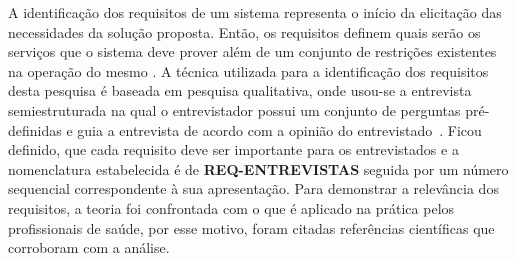 A identificação dos requisitos de um sistema representa o início da elicitação das necessidades da solução proposta. Então, os requisitos definem quais serão os serviços que o sistema deve prover além de um conjunto de restrições existentes na operação do mesmo \cite{sommerville2011}. A técnica utilizada para a identificação dos requisitos desta pesquisa é baseada em pesquisa qualitativa, onde usou-se a entrevista semiestruturada na qual o entrevistador possui um conjunto de perguntas pré-definidas e guia a entrevista de acordo com a opinião do entrevistado~\cite{FLI04}. Ficou definido, que cada requisito deve ser importante para os entrevistados e a nomenclatura estabelecida é de \textbf{REQ-ENTREVISTAS} seguida por um número sequencial correspondente à sua apresentação. Para demonstrar a relevância dos requisitos, a teoria foi confrontada com o que é aplicado na prática pelos profissionais de saúde, por esse motivo, foram citadas referências científicas que corroboram com a análise. 




